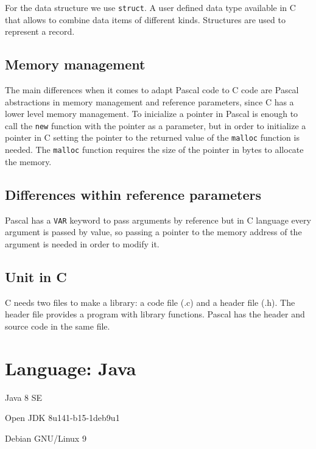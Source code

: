 \documentclass[11pt]{scrartcl} %
\newcommand{\vctilde}{\raisebox{0.5ex}{\texttildelow}}
\begin{document}
For the data structure we use \texttt{struct}. A user defined data type available in C that allows to combine data items of different kinds. Structures are used to represent a record. 

\subsection*{Memory management}

The main differences when it comes to adapt Pascal code to C code are Pascal abstractions in memory management and reference parameters, since C has a lower level memory management. To inicialize a pointer in Pascal is enough to call the \texttt{new} function with the pointer as a parameter, but in order to initialize a pointer in C setting the pointer to the returned value of the \texttt{malloc} function is needed. The \texttt{malloc} function requires the size of the pointer in bytes to allocate the memory.

\subsection*{Differences within reference parameters}

Pascal has a \texttt{VAR} keyword to pass arguments by reference but in C language every argument is passed by value, so passing a pointer to the memory address of the argument is needed in order to modify it.

\subsection*{Unit in C}

C needs two files to make a library: a code file (.c) and a header file (.h). The header file provides a program with library functions.
Pascal has the header and source code in the same file.

\section{Language: Java}

\begin{description}[align=left,labelwidth=10em]
\item [Language Version] Java 8 SE
\item [Compiler] Open JDK 8u141-b15-1\vctilde deb9u1
\item [Operating System] Debian GNU/Linux 9
\end{description}
\end{document}
